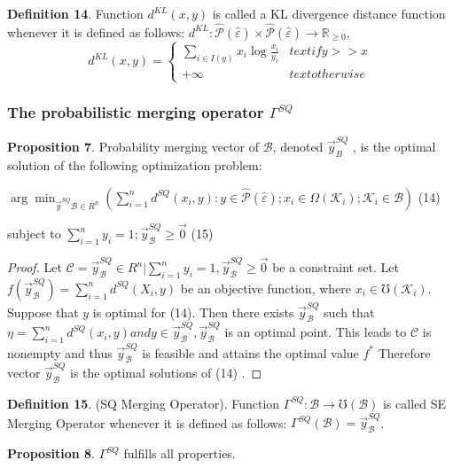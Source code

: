 \documentclass[]{iosart2c}
\begin{document}
  \textbf{Definition 14}. Function $d^{KL}(x, y)$ is called a KL divergence distance function whenever it is defined as follows: $d^{KL} : \hat{\mathcal{P}} (\hat{\varepsilon}) \times \hat{\mathcal{P}} (\hat{\varepsilon}) \to \mathbb{R}_{\geq0}$, $$d^{KL}(x, y) =
  \begin{cases}
    \sum_{i \in I(y)} {x_i \log{\frac{x_i}{y_i}}} &text{if} y >> x \\
    +\infty    &text{otherwise}
  \end{cases}
  $$

  \subsubsection{The probabilistic merging operator $\Gamma^{SQ}$}

  \textbf{Proposition 7}. Probability merging vector of $\mathcal{B}$, denoted $\vec{y}^{SQ}_B$ , is the optimal solution of the following optimization problem:

  $\arg \min_{\vec{y}^{SQ}\mathcal{B} \in R^n}\left( \sum^n_{i=1} d^{SQ}(x_i, y) : y \in \hat{\mathcal{P}} (\hat{\varepsilon});x_i \in \Omega(\mathcal{K}_i);\mathcal{K}_i \in \mathcal{B} \right)$ (14)

  subject to $\sum^n_{i=1}y_i = 1;\vec{y}^{SQ}_\mathcal{B} \geq \vec{0}$ (15)

  \begin{proof}
    Let $\mathcal{C} = {\vec{y}^{SQ}_\mathcal{B} \in R^n | \sum^n_{i=1}  y_i = 1, \vec{y}^{SQ}_\mathcal{B} \geq \vec{0}}$ be a constraint set. Let $f(\vec{y}^{SQ}_\mathcal{B} ) = \sum^n_{i=1} d^{SQ}(X_i, y)$ be an objective function, where $x_i \in \mho(\mathcal{K}_i)$. Suppose that $y$ is optimal for (14). Then there exists $\vec{y}^{SQ}_\mathcal{B}$ such that $\eta = \sum^n_{i=1} d^{SQ}(x_i, y) and y \in \vec{y}^{SQ}_\mathcal{B} , \vec{y}^{SQ}_\mathcal{B}$ is an optimal point. This leads to $\mathcal{C}$ is nonempty and thus $\vec{y}^{SQ}_\mathcal{B}$ is feasible and attains the optimal value $f^*$ Therefore vector $\vec{y}^{SQ}_\mathcal{B}$ is the optimal solutions of (14) \cite{25} .
  \end{proof}

  \textbf{Definition 15}. (SQ Merging Operator). Function $\Gamma^{SQ} : \mathcal{B} \to \mho (\mathcal{B})$ is called SE Merging Operator whenever it is defined as follows:
  $\Gamma^{SQ}(\mathcal{B}) = \vec{y}^{SQ}_\mathcal{B}$.

  \textbf{Proposition 8}. $\Gamma^{SQ}$ fulfills all properties.
\end{document}
